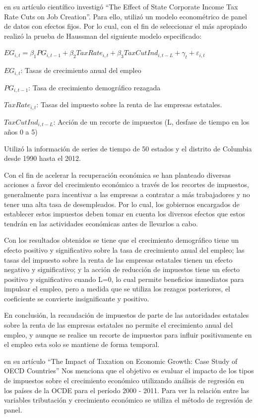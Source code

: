 \documentclass[
  letterpaper,
]{article}
\begin{document}
\textcite{shuai_effect_2013} en su artículo científico investigó ``The
Effect of State Corporate Income Tax Rate Cuts on Job Creation''. Para
ello, utilizó un modelo econométrico de panel de datos con efectos
fijos. Por lo cual, con el fin de seleccionar el más apropiado realizó
la prueba de Haussman del siguiente modelo especificado:

\(EG_{i, t} = β_{1}PG_{i, t-1} + β_{2}TaxRate_{i, t} + β_{3}TaxCutInd_{i, t-L} + γ_t + ε_{i, t}\)

\(EG_{i, t}\): Tasas de crecimiento anual del empleo

\(PG_{i, t-1}\): Tasa de crecimiento demográfico rezagada

\(TaxRate_{i, t}\): Tasas del impuesto sobre la renta de las empresas
estatales.

\(TaxCutInd_{i, t-L}\): Acción de un recorte de impuestos (L, desfase de
tiempo en los años 0 a 5)

Utilizó la información de series de tiempo de 50 estados y el distrito
de Columbia desde 1990 hasta el 2012.

Con el fin de acelerar la recuperación económica se han planteado
diversas acciones a favor del crecimiento económico a través de los
recortes de impuestos, generalmente para incentivar a las empresas a
contratar a más trabajadores y no tener una alta tasa de desempleados.
Por lo cual, los gobiernos encargados de establecer estos impuestos
deben tomar en cuenta los diversos efectos que estos tendrán en las
actividades económicas antes de llevarlos a cabo.

Con los resultados obtenidos se tiene que el crecimiento demográfico
tiene un efecto positivo y significativo sobre la tasa de crecimiento
anual del empleo; las tasas del impuesto sobre la renta de las empresas
estatales tienen un efecto negativo y significativo; y la acción de
reducción de impuestos tiene un efecto positivo y significativo cuando
L=0, lo cual permite beneficios inmediatos para impulsar el empleo, pero
a medida que se utiliza los rezagos posteriores, el coeficiente se
convierte insignificante y positivo.

En conclusión, la recaudación de impuestos de parte de las autoridades
estatales sobre la renta de las empresas estatales no permite el
crecimiento anual del empleo, y aunque se realice un recorte de
impuestos para influir positivamente en el empleo esta solo se mantiene
de forma temporal.

\textcite{macek_impact_2014} en su artículo ``The Impact of Taxation on
Economic Growth: Case Study of OECD Countries'' Nos menciona que el
objetivo es evaluar el impacto de los tipos de impuestos sobre el
crecimiento económico utilizando análisis de regresión en los países de
la OCDE para el período 2000 - 2011. Para ver la relación entre las
variables tributación y crecimiento económico se utiliza el método de
regresión de panel.
\end{document}
